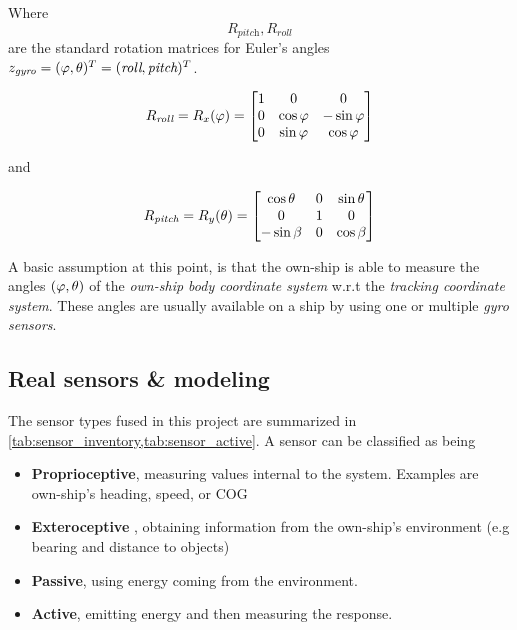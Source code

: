 \begin{description}
Where $$R_{\textit{pitch}},R_{\textit{roll}}$$ are the standard rotation matrices for Euler's angles $z_{\textit{gyro}}=({\varphi},{\theta})^T = (\textit{roll},\textit{pitch})^T$.


\begin{equation}
R_{\textit{roll}}= R_x({\varphi}) =
\begin{bmatrix}
1 &0 &0\\
0 &\cos{\varphi} &-\sin {\varphi}\\
0 &\sin {\varphi} &\cos {\varphi}
\end{bmatrix}
\end{equation}


and


\begin{equation}
R_{\textit{pitch}}= R_y({\theta}) =
\begin{bmatrix}
\cos{\theta} &0 &\sin {\theta}\\
0 &1 &0\\
-\sin \beta &0 &\cos\beta
\end{bmatrix}
\end{equation}

A basic assumption at this point, is that the own-ship is able to measure the angles $({\varphi},{\theta})$ of the \emph{own-ship body coordinate system} w.r.t the \emph{tracking coordinate system}. These angles are usually available on a ship by using one or multiple \emph{gyro sensors}.

\end{description}

\subsection{Real sensors \& modeling}

The sensor types fused in this project are summarized in \cref{tab:sensor_inventory,tab:sensor_active}. A sensor can be classified as being

\begin{itemize}
\item\textbf{Proprioceptive}, measuring values internal to
	the system. Examples are own-ship's heading, speed, or COG
	\item\textbf{Exteroceptive} , obtaining information from the own-ship's environment (e.g bearing and distance to objects)
	\item\textbf{Passive}, using energy coming from the
	environment. 
	\item\textbf{Active}, emitting energy and then measuring the response.
\end{itemize}
 

